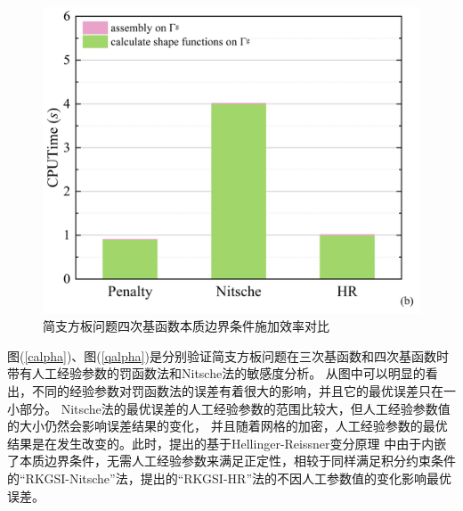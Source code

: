 \begin{figure}[H]
    \centering
    \includegraphics[scale=0.5]{figure/PHR/R/Qefficiency.png}
    \caption{简支方板问题四次基函数本质边界条件施加效率对比}\label{RQcputime}
\end{figure}
图(\ref{calpha})、图(\ref{qalpha})是分别验证简支方板问题在三次基函数和四次基函数时带有人工经验参数的罚函数法和Nitsche法的敏感度分析。
从图中可以明显的看出，不同的经验参数对罚函数法的误差有着很大的影响，并且它的最优误差只在一小部分。
Nitsche法的最优误差的人工经验参数的范围比较大，但人工经验参数值的大小仍然会影响误差结果的变化，
并且随着网格的加密，人工经验参数的最优结果是在发生改变的。此时，提出的基于Hellinger-Reissner变分原理
中由于内嵌了本质边界条件，无需人工经验参数来满足正定性，相较于同样满足积分约束条件的“RKGSI-Nitsche”法，提出的“RKGSI-HR”法的不因人工参数值的变化影响最优误差。
